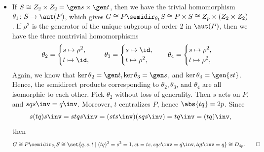 \begin{sol}
\begin{itemize}
        If $p \equiv 1 \pmod 4$, then $p - 1 \equiv 0 \pmod 4$, hence $\phi(s)$ can be sent to $\id$ or one of the two elements of order 4 in $\aut(P)$ (which are isomorphic since their images generate the same subgroup), or the unique element of order 2 in $\aut(P)$.
	    If $\aut(P) = \gen\alpha$, let $\rho = \alpha^{(p - 1)/4}$, which has order 4.
	    Then we have the three nontrivial homomorphisms
        \[
        	\phi_1 \colon s \mapsto \rho, \quad \phi_2 \colon s \mapsto \rho^3, \quad \phi_3 \colon s \mapsto \rho^2.
        \]
        We know that $\phi_1$ and $\phi_2$ give isomorphic semidirect products, since $\phi_1(S) = \phi_2(S) = \gen\rho$.
	    Hence, we have two non-abelian groups of order $4p$, and we have
        \[
        	G \cong P \semidir_{\phi_1} S \cong \set{q, s \mid q^p = s^4 = 1, sqs\inv = q^k},
        \]
        for some $k \in \units[p]$ such that $\abs{k} = 4$.
	    In the case of $\phi_3$, we have $sqs\inv = q\inv$.
	    Then
        \[
        	G \cong P \semidir_{\phi_3} S \cong \set{q, s \mid q^p = s^4 = 1, sqs\inv = q\inv}.
        \]
        \item If $S \cong Z_2 \times Z_2 = \gen s \times \gen t$, then we have the trivial homomorphism $\theta_1 \colon S \to \aut(P)$, which gives $G \cong P \semidir_{\theta_1} S \cong P \times S \cong Z_p \times (Z_2 \times Z_2)$.
	    If $\rho^2$ is the generator of the unique subgroup of order 2 in $\aut(P)$, then we have the three nontrivial homomorphisms
        \[
        	\theta_2 = 
            \begin{cases}
                s \mapsto \rho^2, \\
                t \mapsto \id,
            \end{cases} \quad
            \theta_3 =
            \begin{cases}
                s \mapsto \id, \\
                t \mapsto \rho^2,
            \end{cases} \quad
            \theta_4 =
            \begin{cases}
                s \mapsto \rho^2, \\
                t \mapsto \rho^2,
            \end{cases}
        \]
        Again, we know that $\ker\theta_2 = \gen t, \ker\theta_3 = \gen s$, and $\ker\theta_4 = \gen{st}$.
        Hence, the semidirect products corresponding to $\theta_2, \theta_3$, and $\theta_4$ are all isomorphic to each other.
        Pick $\theta_2$ without loss of generality.
        Then $s$ acts on $P$, and $sqs\inv = q\inv$.
        Moreover, $t$ centralizes $P$, hence $\abs{tq} = 2p$.
        Since
        \[
        	s(tq)s\inv = stqs\inv = (sts\inv)(sqs\inv) = tq\inv = (tq)\inv,
        \]
        then
        \[
        	G \cong P \semidir_{\theta_2} S \cong \set{q, s, t \mid (tq)^2 = s^2 = 1, st = ts, sqs\inv = q\inv, tqt\inv = q} \cong D_{4p}. \qedhere
        \]
    \end{itemize}
\end{sol}

